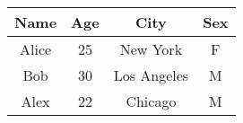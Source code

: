 \documentclass{article}
\begin{document}
\begin{tabular}{|c|c|c|c|}
\hline
Name & Age & City & Sex \\
\hline
Alice & 25 & New York & F \\
\hline
Bob & 30 & Los Angeles & M \\
\hline
Alex & 22 & Chicago & M \\
\hline
\end{tabular}
\end{document}
